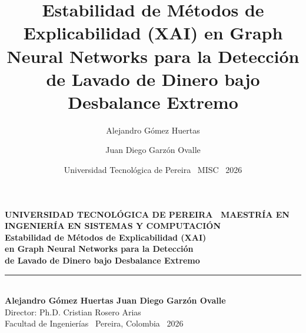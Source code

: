 \documentclass[aspectratio=169,11pt]{beamer}
\title[Estabilidad XAI en GNNs]{Estabilidad de Métodos de Explicabilidad (XAI) en Graph Neural Networks para la Detección de Lavado de Dinero bajo Desbalance Extremo}
\author[Gómez \& Garzón]{Alejandro Gómez Huertas \and Juan Diego Garzón Ovalle}
\institute[UTP]{Director: Ph.D. Cristian Rosero Arias}
\date{Universidad Tecnológica de Pereira \textperiodcentered\ MISC \textperiodcentered\ 2026}
\begin{document}
{
\begin{frame}
\vspace{0.5cm}
{\color{amber}\footnotesize\bfseries UNIVERSIDAD TECNOLÓGICA DE PEREIRA \textperiodcentered\ MAESTRÍA EN INGENIERÍA EN SISTEMAS Y COMPUTACIÓN}\\[14pt]
{\color{white}\Large\bfseries Estabilidad de Métodos de Explicabilidad (XAI)\\[2pt] en Graph Neural Networks para la Detección\\[2pt] de Lavado de Dinero bajo Desbalance Extremo}\\[12pt]
{\color{amber}\rule{1.4cm}{2.5pt}}\\[12pt]
{\color{white}\normalsize\bfseries Alejandro Gómez Huertas \quad\textperiodcentered\quad Juan Diego Garzón Ovalle}\\[5pt]
{\color{white!80}\small Director: Ph.D. Cristian Rosero Arias}\\[2pt]
{\color{white!80}\small Facultad de Ingenierías \textperiodcentered\ Pereira, Colombia \textperiodcentered\ 2026}
\vfill
\end{frame}}
\end{document}
